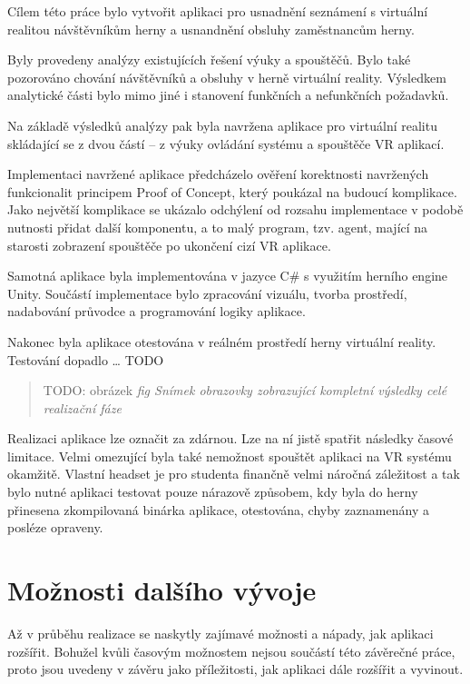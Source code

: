 Cílem této práce bylo vytvořit aplikaci pro usnadnění seznámení s
virtuální realitou návštěvníkům herny a usnandnění obsluhy zaměstnancům
herny.

Byly provedeny analýzy existujících řešení výuky a spouštěčů. Bylo také
pozorováno chování návštěvníků a obsluhy v herně virtuální reality.
Výsledkem analytické části bylo mimo jiné i stanovení funkčních a
nefunkčních požadavků.

Na základě výsledků analýzy pak byla navržena aplikace pro virtuální
realitu skládající se z dvou částí -- z výuky ovládání systému a
spouštěče VR aplikací.

Implementaci navržené aplikace předcházelo ověření korektnosti
navržených funkcionalit principem Proof of Concept, který poukázal na
budoucí komplikace. Jako největší komplikace se ukázalo odchýlení od
rozsahu implementace v podobě nutnosti přidat další komponentu, a to
malý program, tzv. agent, mající na starosti zobrazení spouštěče po
ukončení cizí VR aplikace.

Samotná aplikace byla implementována v jazyce C\# s využitím herního
engine Unity. Součástí implementace bylo zpracování vizuálu, tvorba
prostředí, nadabování průvodce a programování logiky aplikace.

Nakonec byla aplikace otestována v reálném prostředí herny virtuální
reality. Testování dopadlo \ldots{} TODO

\begin{quote}
TODO: obrázek \emph{fig Snímek obrazovky zobrazující kompletní výsledky
celé realizační fáze}
\end{quote}

Realizaci aplikace lze označit za zdárnou. Lze na ní jistě spatřit
následky časové limitace. Velmi omezující byla také nemožnost spouštět
aplikaci na VR systému okamžitě. Vlastní headset je pro studenta
finančně velmi náročná záležitost a tak bylo nutné aplikaci testovat
pouze nárazově způsobem, kdy byla do herny přinesena zkompilovaná
binárka aplikace, otestována, chyby zaznamenány a posléze opraveny.

\section{Možnosti dalšího
vývoje}\label{moux17enosti-dalux161uxedho-vuxfdvoje}

Až v průběhu realizace se naskytly zajímavé možnosti a nápady, jak
aplikaci rozšířit. Bohužel kvůli časovým možnostem nejsou součástí této
závěrečné práce, proto jsou uvedeny v závěru jako příležitosti, jak
aplikaci dále rozšířit a vyvinout.

